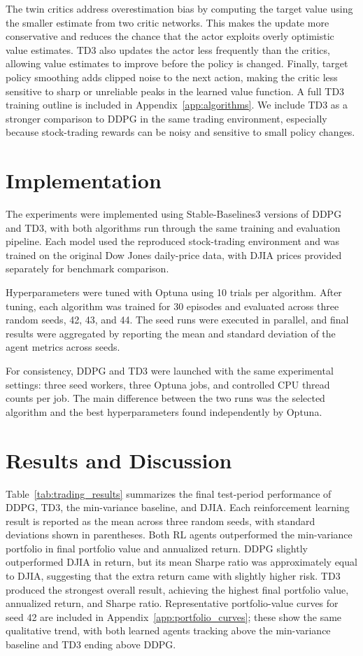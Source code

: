 \documentclass{article}
\begin{document}
The twin critics address overestimation bias by computing the target value using the smaller estimate from two critic networks. This makes the update more conservative and reduces the chance that the actor exploits overly optimistic value estimates. TD3 also updates the actor less frequently than the critics, allowing value estimates to improve before the policy is changed. Finally, target policy smoothing adds clipped noise to the next action, making the critic less sensitive to sharp or unreliable peaks in the learned value function. A full TD3 training outline is included in Appendix~\ref{app:algorithms}. We include TD3 as a stronger comparison to DDPG in the same trading environment, especially because stock-trading rewards can be noisy and sensitive to small policy changes.

\section{Implementation}

The experiments were implemented using Stable-Baselines3 versions of DDPG and TD3, with both algorithms run through the same training and evaluation pipeline. Each model used the reproduced stock-trading environment and was trained on the original Dow Jones daily-price data, with DJIA prices provided separately for benchmark comparison.

Hyperparameters were tuned with Optuna using 10 trials per algorithm. After tuning, each algorithm was trained for 30 episodes and evaluated across three random seeds, 42, 43, and 44. The seed runs were executed in parallel, and final results were aggregated by reporting the mean and standard deviation of the agent metrics across seeds.

For consistency, DDPG and TD3 were launched with the same experimental settings: three seed workers, three Optuna jobs, and controlled CPU thread counts per job. The main difference between the two runs was the selected algorithm and the best hyperparameters found independently by Optuna.

\section{Results and Discussion}

Table~\ref{tab:trading_results} summarizes the final test-period performance of DDPG, TD3, the min-variance baseline, and DJIA. Each reinforcement learning result is reported as the mean across three random seeds, with standard deviations shown in parentheses. Both RL agents outperformed the min-variance portfolio in final portfolio value and annualized return. DDPG slightly outperformed DJIA in return, but its mean Sharpe ratio was approximately equal to DJIA, suggesting that the extra return came with slightly higher risk. TD3 produced the strongest overall result, achieving the highest final portfolio value, annualized return, and Sharpe ratio. Representative portfolio-value curves for seed 42 are included in Appendix~\ref{app:portfolio_curves}; these show the same qualitative trend, with both learned agents tracking above the min-variance baseline and TD3 ending above DDPG.
\end{document}
